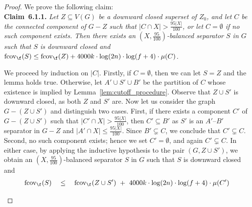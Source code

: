 \LPoptVSintegral*
\begin{proof}
    We prove the following claim:\\[-4pt]
    
    \noindent\textbf{Claim~6.1.1.}\label{claim:balanced_sep_cutoff_step}
        \emph{Let $Z\subseteq V(G)$ be a downward closed superset of $Z_0$, and let $C$ be the connected component of $G - Z$ such that $|C \cap X| > \frac{95|X|}{100}$, or let $C = \emptyset$ if no such component exists. Then there exists an $(X, \frac{95}{100})$-balanced separator $S$ in $G$ such that $S$ is downward closed and $\mathrm{fcov}_{\f}(S) \leq \mathrm{fcov}_{\f}(Z) + 4000k \cdot \log(2n) \cdot \log (f + 4) \cdot \mu(C)$.}
    \begin{claimproof}
        We proceed by induction on $|C|$. Firstly, if $C = \emptyset$, then we can let $S = Z$ and the lemma holds true. Otherwise, let $A'\cup S'\cup B'$ be the partition of $C$ whose existence is implied by Lemma~\ref{lem:cutoff_procedure}. Observe that $Z\cup S'$ is downward closed, as both $Z$ and $S'$ are. Now let us consider the graph $G-(Z\cup S')$ and distinguish two cases. First, if there exists a component $C'$ of $G - (Z \cup S')$ such that $|C' \cap X| > \frac{95|X|}{100}$, then $C' \subseteq B'$ as $S'$ is an $A'$--$B'$ separator in $G - Z$ and $|A' \cap X| \leq \frac{95|X|}{100}$. Since $B' \subsetneq C$, we conclude that $C' \subsetneq C$. Second, no such component exists; hence we set $C'=\emptyset$, and again $C' \subsetneq C$. In either case, by applying the inductive hypothesis to the pair $(G, Z \cup S')$, we obtain an $(X, \frac{95}{100})$-balanced separator $S$ in $G$ such that $S$ is downward closed and
        \begin{align*}
            \mathrm{fcov}_{\f}(S) \quad
            &\leq \quad \mathrm{fcov}_{\f}(Z \cup S')\ +\ 4000k \cdot \log(2n) \cdot \log (f + 4) \cdot \mu(C') \\

\end{align*}
\end{claimproof}
\end{proof}
